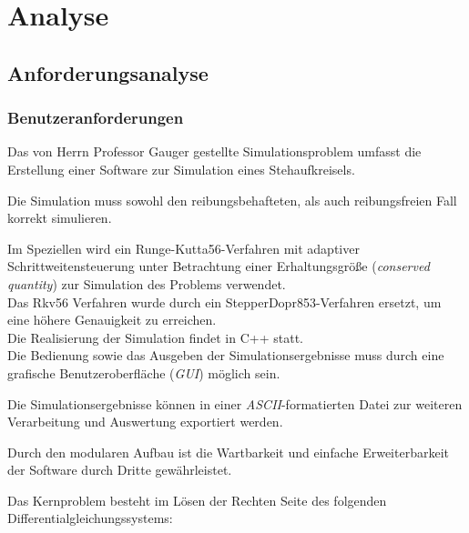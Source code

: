 \chapter{Analyse}
\label{ch:2}

\section{Anforderungsanalyse}
\label{sec:2.1}

\subsection{Benutzeranforderungen}

{Das von Herrn Professor Gauger gestellte Simulationsproblem umfasst die Erstellung einer Software zur Simulation eines Stehaufkreisels.

Die Simulation muss sowohl den reibungsbehafteten, als auch reibungsfreien Fall korrekt simulieren.

Im Speziellen wird ein Runge-Kutta56-Verfahren mit adaptiver Schrittweitensteuerung unter Betrachtung einer Erhaltungsgr\"o\ss e (\textit{conserved quantity}) zur Simulation des Problems verwendet.\\ 

Das Rkv56 Verfahren wurde durch ein StepperDopr853-Verfahren ersetzt, um eine h\"ohere Genauigkeit zu erreichen.\\ 
Die Realisierung der Simulation findet in C++ statt. \\

Die Bedienung sowie das Ausgeben der Simulationsergebnisse muss durch eine grafische Benutzeroberfl\"ache (\textit{GUI}) m\"oglich sein.

Die Simulationsergebnisse k\"onnen in einer \textit{ASCII}-formatierten Datei zur weiteren Verarbeitung und Auswertung exportiert werden.

Durch den modularen Aufbau ist die Wartbarkeit und einfache Erweiterbarkeit der Software durch Dritte gew\"ahrleistet.
 

Das Kernproblem besteht im L\"osen der Rechten Seite des folgenden Differentialgleichungssystems:

}
